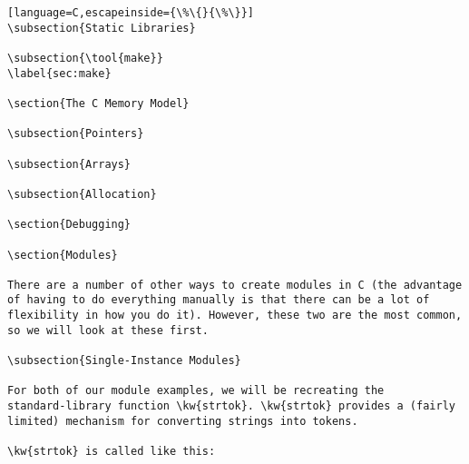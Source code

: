 \documentclass[a4paper,10pt]{article}
\newcommand{\kw}[1]{\texttt{#1}}
\newcommand{\tool}[1]{\texttt{#1}}
\begin{document}
\begin{lstlisting}[language=C,escapeinside={\%\{}{\%\}}]
\subsection{Static Libraries}

\subsection{\tool{make}}
\label{sec:make}

\section{The C Memory Model}

\subsection{Pointers}

\subsection{Arrays}

\subsection{Allocation}

\section{Debugging}

\section{Modules}

There are a number of other ways to create modules in C (the advantage
of having to do everything manually is that there can be a lot of
flexibility in how you do it). However, these two are the most common,
so we will look at these first.

\subsection{Single-Instance Modules}

For both of our module examples, we will be recreating the
standard-library function \kw{strtok}. \kw{strtok} provides a (fairly
limited) mechanism for converting strings into tokens.

\kw{strtok} is called like this:


\end{lstlisting}
\end{document}

